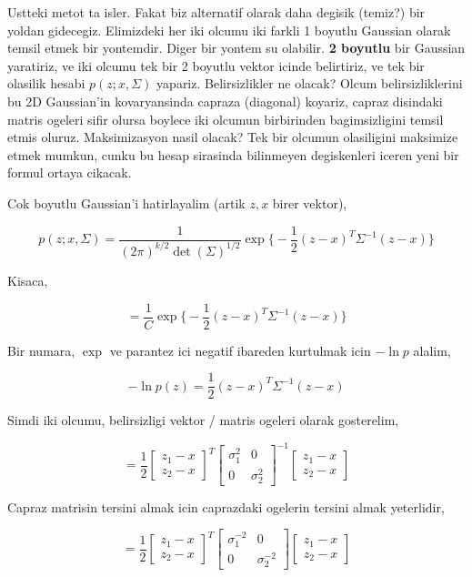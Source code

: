 \documentclass[12pt,fleqn]{article}\usepackage{../common}
\begin{document}
Ustteki metot ta isler. Fakat biz alternatif olarak daha degisik (temiz?)
bir yoldan gidecegiz. Elimizdeki her iki olcumu iki farkli 1 boyutlu
Gaussian olarak temsil etmek bir yontemdir. Diger bir yontem su
olabilir. \textbf{2 boyutlu} bir Gaussian yaratiriz, ve iki olcumu tek bir
2 boyutlu vektor icinde belirtiriz, ve tek bir olasilik hesabi $p(z;x,\Sigma)$ 
yapariz. Belirsizlikler ne olacak? Olcum belirsizliklerini bu 2D
Gaussian'in kovaryansinda capraza (diagonal) koyariz, capraz disindaki
matris ogeleri sifir olursa boylece iki olcumun birbirinden bagimsizligini
temsil etmis oluruz. Maksimizasyon nasil olacak? Tek bir olcumun
olasiligini maksimize etmek mumkun, cunku bu hesap sirasinda bilinmeyen
degiskenleri iceren yeni bir formul ortaya cikacak. 

Cok boyutlu Gaussian'i hatirlayalim (artik $z,x$ birer vektor),

$$ p(z;x,\Sigma) = 
\frac{ 1}{(2\pi)^{k/2} \det(\Sigma)^{1/2}} \exp 
\bigg\{ 
-\frac{ 1}{2}(z-x)^T\Sigma^{-1}(z-x)
\bigg\} $$

Kisaca,

$$ =  \frac{ 1}{C} \exp 
\bigg\{ 
-\frac{ 1}{2}(z-x)^T\Sigma^{-1}(z-x)
\bigg\} $$

Bir numara, $\exp$ ve parantez ici negatif ibareden kurtulmak icin
$-\ln p$ alalim,

$$ -\ln p(z) = 
\frac{ 1}{2}(z-x)^T\Sigma^{-1}(z-x)
$$

Simdi iki olcumu, belirsizligi vektor / matris ogeleri olarak gosterelim, 

$$ = \frac{1}{2}  
\left[\begin{array}{c}
z_1-x \\ z_2-x
\end{array}\right]^T
\left[\begin{array}{cc}
\sigma_1^2 & 0 \\
0 & \sigma_2^2 
\end{array}\right]^{-1}
\left[\begin{array}{c}
z_1-x \\ z_2-x
\end{array}\right]
$$

Capraz matrisin tersini almak icin caprazdaki ogelerin tersini almak
yeterlidir,

$$ = \frac{1}{2}  
\left[\begin{array}{c}
z_1-x \\ z_2-x
\end{array}\right]^T
\left[\begin{array}{cc}
\sigma_1^{-2} & 0 \\
0 & \sigma_2^{-2} 
\end{array}\right]
\left[\begin{array}{c}
z_1-x \\ z_2-x
\end{array}\right]
$$
\end{document}
